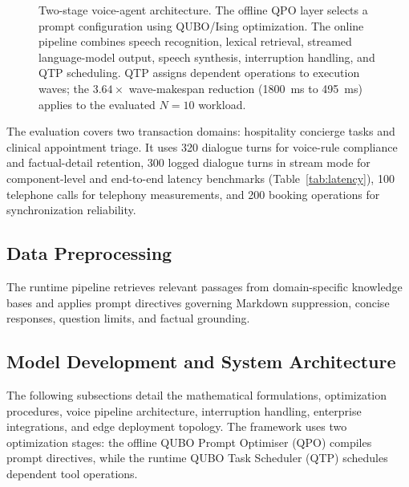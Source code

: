 \documentclass[review,12pt,times,authoryear]{elsarticle}
\theoremstyle{definition}
\begin{document}
\begin{figure}[t]
{\begin{tikzpicture}
\end{tikzpicture}
}%
\caption{Two-stage voice-agent architecture. The offline QPO layer selects a prompt configuration using QUBO/Ising optimization. The online pipeline combines speech recognition, lexical retrieval, streamed language-model output, speech synthesis, interruption handling, and QTP scheduling. QTP assigns dependent operations to execution waves; the $3.64\times$ wave-makespan reduction (\SI{1800}{\milli\second} to \SI{495}{\milli\second}) applies to the evaluated $N=10$ workload.}
\label{fig:architecture}
\end{figure}

The evaluation covers two transaction domains: hospitality concierge tasks and clinical appointment triage. It uses 320 dialogue turns for voice-rule compliance and factual-detail retention, 300 logged dialogue turns in stream mode for component-level and end-to-end latency benchmarks (Table~\ref{tab:latency}), 100 telephone calls for telephony measurements, and 200 booking operations for synchronization reliability. 

\subsection{Data Preprocessing}
The runtime pipeline retrieves relevant passages from domain-specific knowledge bases and applies prompt directives governing Markdown suppression, concise responses, question limits, and factual grounding. 

\subsection{Model Development and System Architecture}
The following subsections detail the mathematical formulations, optimization procedures, voice pipeline architecture, interruption handling, enterprise integrations, and edge deployment topology. The framework uses two optimization stages: the offline QUBO Prompt Optimiser (QPO) compiles prompt directives, while the runtime QUBO Task Scheduler (QTP) schedules dependent tool operations.
\end{document}
